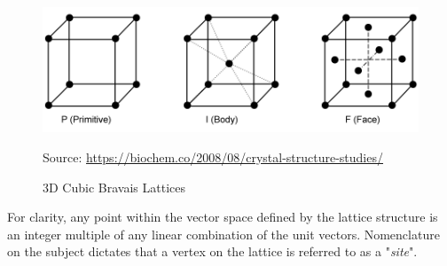 \begin{figure}[!htb]
    \caption{3D Cubic Bravais Lattices}
    \begin{center}
        \includegraphics[scale=0.25]{Figures/lattices}
    \end{center}
    \scriptsize{\dag Source: \url{https://biochem.co/2008/08/crystal-structure-studies/}}
 \end{figure}
 For clarity, any point within the vector space defined by the lattice
 structure is an integer multiple of any linear combination of the unit vectors. Nomenclature
 on the subject dictates that a vertex on the lattice is 
 referred to as a "\emph{site}". 
